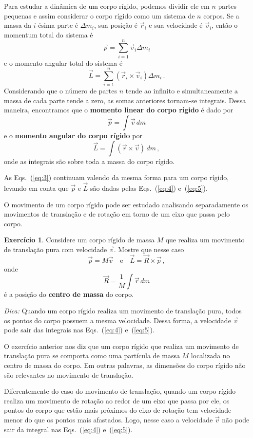 \documentclass[twocolumn=on,fontsize=12pt,DIV=calc]{scrartcl}
\theoremstyle{definition}
\newtheorem{ex}{Exercício}[section]
\begin{document}
Para estudar a dinâmica de um corpo rígido, podemos dividir ele em $n$
partes pequenas e assim considerar o corpo rígido como um sistema de
$n$ corpos. Se a massa da $i$-ésima parte é $\Delta m_i$, sua posição
é $\vec r_i$ e sua velocidade é $\vec v_i$, então o momentum total do
sistema é
$$\vec p=\sum_{i=1}^n\vec v_i\Delta m_i$$
e o momento angular total do sistema é
$$\vec L=\sum_{i=1}^n(\vec r_i\times\vec v_i)\Delta m_i\,.$$
Considerando que o número de partes $n$ tende ao infinito e
simultaneamente a massa de cada parte tende a zero, as somas
anteriores tornam-se integrais. Dessa maneira, encontramos que o
\textbf{momento linear do corpo rígido} é dado por
\begin{equation}
  \label{eq:4}
  \vec p=\int \vec v\,dm
\end{equation}
e o \textbf{momento angular do corpo rígido} por
\begin{equation}
  \label{eq:5}
  \vec L=\int (\vec r\times\vec v)\,dm\,,
\end{equation}
onde as integrais são sobre toda a massa do corpo rígido.

As Eqs.~(\ref{eq:3}) continuam valendo da mesma forma para um corpo
rígido, levando em conta que $\vec p$ e $\vec L$ são dadas pelas
Eqs.~(\ref{eq:4}) e~(\ref{eq:5}).

O movimento de um corpo rígido pode ser estudado analisando
separadamente os movimentos de translação e de rotação em torno de um
eixo que passa pelo corpo.

\begin{ex}
  Considere um corpo rígido de massa $M$ que realiza um movimento de
  translação pura com velocidade $\vec v$. Mostre que nesse caso
  $$\vec p=M\vec v\quad\text{e}\quad\vec L=\vec R\times\vec p\,,$$
  onde
  $$\vec R=\frac{1}{M}\int \vec r\,dm$$
  é a posição do \textbf{centro de massa} do corpo.

  \noindent\textit{Dica:} Quando um corpo rígido realiza um movimento de translação pura, todos os pontos do corpo possuem a mesma velocidade. Dessa forma, a
  velocidade $\vec v$ pode sair das integrais nas Eqs.~(\ref{eq:4})
  e~(\ref{eq:5}).
\end{ex}

O exercício anterior nos diz que um corpo rígido que realiza um
movimento de translação pura se comporta como uma partícula de massa
$M$ localizada no centro de massa do corpo. Em outras palavras, as
dimensões do corpo rígido não são relevantes no movimento de
translação.

Diferentemente do caso do movimento de trans\-la\-ção, quando um corpo
rígido realiza um movimento de rotação ao redor de um eixo que passa
por ele, os pontos do corpo que estão mais próximos do eixo de rotação
tem velocidade menor do que os pontos mais afastados. Logo, nesse caso
a velocidade $\vec v$ não pode sair da integral nas Eqs.~(\ref{eq:4})
e~(\ref{eq:5}).
\end{document}
